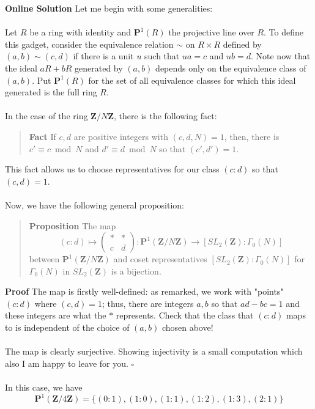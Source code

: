 \documentclass[12pt]{article}
\begin{document}
\noindent \textbf{Online Solution}
\noindent Let me begin with some generalities: \\ \\
Let $R$ be a ring with identity and $\mathbf{P}^1(R)$ the projective line over $R$. To define this gadget, consider the equivalence relation $\sim$ on $R \times R$ defined by $(a, b) \sim (c, d)$ if there is a unit $u$ such that $ua = c$ and $ub = d$. Note now that the ideal $aR + bR$ generated by $(a, b)$ depends only on the equivalence class of $(a, b)$. Put $\mathbf{P}^1(R)$ for the set of all equivalence classes for which this ideal generated is the full ring $R$. \\ \\
In the case of the ring $\mathbf{Z}/N\mathbf{Z}$, there is the following fact: 
\begin{quotation}\noindent \textbf{Fact} If $c, d$ are positive integers with $(c, d, N) = 1$, then, there is $c' \equiv c \bmod{N}$ and $d' \equiv d \bmod{N}$ so that $(c' , d') = 1$. \end{quotation}
This fact allows us to choose representatives for our class $(c: d)$ so that $(c, d) = 1$.  \\ \\
Now, we have the following general proposition:
\begin{quotation}\noindent \textbf{Proposition} The map $$(c: d) \mapsto \begin{pmatrix} \ast & \ast \\ c & d\end{pmatrix}: \mathbf{P}^1(\mathbf{Z}/N\mathbf{Z}) \to [SL_2(\mathbf{Z}):\Gamma_0(N)]$$ 
between $\mathbf{P}^1(\mathbf{Z}/N\mathbf{Z})$ and coset representatives $[SL_2(\mathbf{Z}):\Gamma_0(N)]$ for $\Gamma_0(N)$ in $SL_2(\mathbf{Z})$ is a bijection. \end{quotation}
\textbf{Proof} The map is firstly well-defined: as remarked, we work with "points" $(c :d)$ where $(c, d) = 1$; thus, there are integers $a, b$ so that $ad - bc = 1$ and these integers are what the $\ast$ represents. Check that the class that $(c :d )$ maps to is independent of the choice of $(a, b)$ chosen above! \\ \\
The map is clearly surjective. Showing injectivity is a small computation which also I am happy to leave for you.  \hfill $\square$ \\ \\
In this case, we have 
$$\mathbf{P}^1(\mathbf{Z}/4\mathbf{Z}) = \{(0:1), (1:0), (1:1), (1:2), (1:3), (2:1)\} $$
\end{document}
